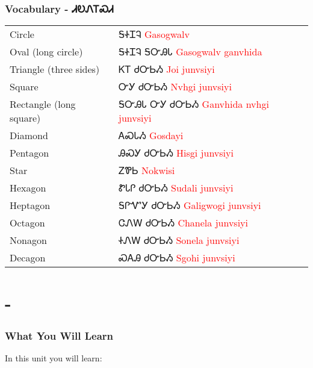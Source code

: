 \subsection{Vocabulary - ᏗᎧᏁᎢᏍᏗ 
}
\begin{tabular}{p{3cm} p{11cm}}
Circle & ᎦᏐᏆᎸ 
 \newline \textcolor{red}{Gasogwalv}\\
Oval (long circle) & ᎦᏐᏆᎸ ᎦᏅᎯᏓ 
 \newline \textcolor{red}{Gasogwalv ganvhida}\\
Triangle (three sides) & ᏦᎢ ᏧᏅᏏᏱ 
 \newline \textcolor{red}{Joi junvsiyi}\\
Square & ᏅᎩ ᏧᏅᏏᏱ 
 \newline \textcolor{red}{Nvhgi junvsiyi}\\
Rectangle (long square) & ᎦᏅᎯᏓ ᏅᎩ ᏧᏅᏏᏱ 
 \newline \textcolor{red}{Ganvhida nvhgi junvsiyi}\\
Diamond & ᎪᏍᏓᏱ 
 \newline \textcolor{red}{Gosdayi}\\
Pentagon & ᎯᏍᎩ ᏧᏅᏏᏱ 
 \newline \textcolor{red}{Hisgi junvsiyi}\\
Star & ᏃᏈᏏ 
 \newline \textcolor{red}{Nokwisi}\\
Hexagon & ᏑᏓᎵ ᏧᏅᏏᏱ 
 \newline \textcolor{red}{Sudali junvsiyi}\\
Heptagon & ᎦᎵᏉᎩ ᏧᏅᏏᏱ 
 \newline \textcolor{red}{Galigwogi junvsiyi}\\
Octagon & ᏣᏁᎳ ᏧᏅᏏᏱ 
 \newline \textcolor{red}{Chanela junvsiyi}\\
Nonagon & ᏐᏁᎳ ᏧᏅᏏᏱ 
 \newline \textcolor{red}{Sonela junvsiyi}\\
Decagon & ᏍᎪᎯ ᏧᏅᏏᏱ 
 \newline \textcolor{red}{Sgohi junvsiyi}\\
\end{tabular}

\index{}
\index{}
\chapter{ - }
\subsection{What You Will Learn}
In this unit you will learn:

